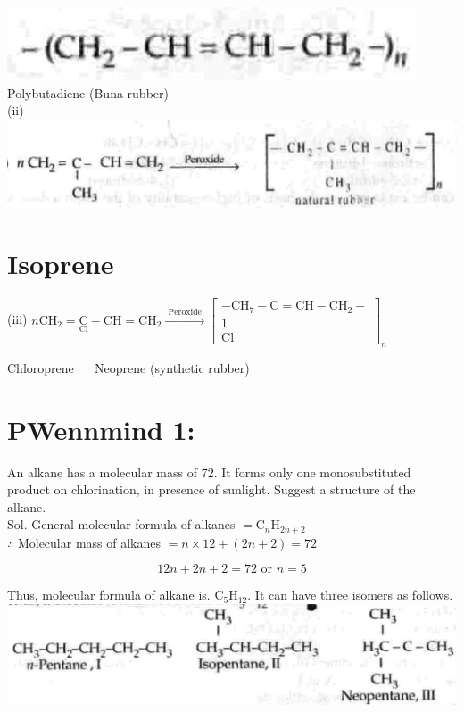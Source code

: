 \documentclass[10pt]{article}
\begin{document}
\includegraphics[max width=\textwidth]{2025_01_28_8470952b98110cec3aabg-196} Polybutadiene (Buna rubber)\\
(ii)\\
\includegraphics[max width=\textwidth, center]{2025_01_28_8470952b98110cec3aabg-196(6)}

\section*{Isoprene}
(iii) $n \mathrm{CH}_{2}=\underset{\mathrm{Cl}}{\mathrm{C}}-\mathrm{CH}=\mathrm{CH}_{2} \xrightarrow{\text { Peroxide }}\left[\begin{array}{c}-\mathrm{CH}_{7}-\mathrm{C}=\mathrm{CH}-\mathrm{CH}_{2}- \\ 1 \\ \mathrm{Cl}\end{array}\right]_{n}$

Chloroprene $\quad$ Neoprene (synthetic rubber)

\section*{PWennmind 1:}
An alkane has a molecular mass of 72. It forms only one monosubstituted product on chlorination, in presence of sunlight. Suggest a structure of the alkane.\\
Sol. General molecular formula of alkanes $=\mathrm{C}_{n} \mathrm{H}_{2 n+2}$\\
$\therefore$ Molecular mass of alkanes $=n \times 12+(2 n+2)=72$

$$
12 n+2 n+2=72 \text { or } n=5
$$

Thus, molecular formula of alkane is. $\mathrm{C}_{5} \mathrm{H}_{12}$. It can have three isomers as follows.\\
\includegraphics[max width=\textwidth, center]{2025_01_28_8470952b98110cec3aabg-197(4)}
\end{document}
